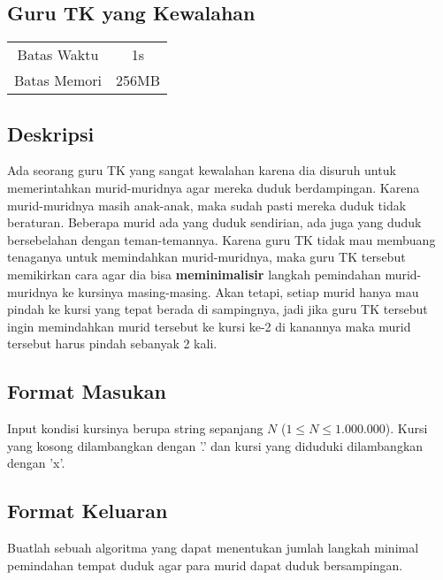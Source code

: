 \documentclass{article}
\begin{document}
\begin{center}

    
    \section*{Guru TK yang Kewalahan} %

    \begin{tabular}{ | c c | }
        \hline
        Batas Waktu  & 1s \\    %
        Batas Memori & 256MB \\  %
        \hline
    \end{tabular}
\end{center}

\subsection*{Deskripsi}
Ada seorang guru TK yang sangat kewalahan karena dia disuruh untuk memerintahkan murid-muridnya agar mereka duduk berdampingan. Karena murid-muridnya masih anak-anak, maka sudah pasti mereka duduk tidak beraturan. Beberapa murid ada yang duduk sendirian, ada juga yang duduk bersebelahan dengan teman-temannya. Karena guru TK tidak mau membuang tenaganya untuk memindahkan murid-muridnya, maka guru TK tersebut memikirkan cara agar dia bisa \textbf{meminimalisir} langkah pemindahan murid-muridnya ke kursinya masing-masing. Akan tetapi, setiap murid hanya mau pindah ke kursi yang tepat berada di sampingnya, jadi jika guru TK tersebut ingin memindahkan murid tersebut ke kursi ke-2 di kanannya maka murid tersebut harus pindah sebanyak 2 kali.

\subsection*{Format Masukan}
Input kondisi kursinya berupa string sepanjang $N$ ($1 \leq N \leq 1.000.000$). Kursi yang kosong dilambangkan dengan '.' dan kursi yang diduduki dilambangkan dengan 'x'.

\subsection*{Format Keluaran}
Buatlah sebuah algoritma yang dapat menentukan jumlah langkah minimal pemindahan tempat duduk agar para murid dapat duduk bersampingan.
\\
\end{document}
